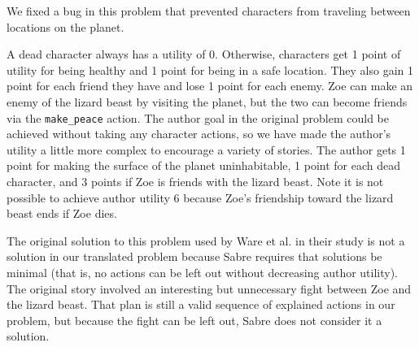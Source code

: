 \documentclass{nilreport}
\begin{document}
We fixed a bug in this problem that prevented characters from traveling
between locations on the planet.

A dead character always has a utility of 0. Otherwise, characters
get 1 point of utility for being healthy and 1 point for being in
a safe location. They also gain 1 point for each friend they have
and lose 1 point for each enemy. Zoe can make an enemy of the lizard
beast by visiting the planet, but the two can become friends via the
\texttt{make\_peace} action. The author goal in the original problem
could be achieved without taking any character actions, so we have
made the author's utility a little more complex to encourage a variety
of stories. The author gets 1 point for making the surface of the
planet uninhabitable, 1 point for each dead character, and 3 points
if Zoe is friends with the lizard beast. Note it is not possible to
achieve author utility 6 because Zoe's friendship toward the lizard
beast ends if Zoe dies.

The original solution to this problem used by Ware et al. in their
study is not a solution in our translated problem because Sabre requires
that solutions be minimal (that is, no actions can be left out without
decreasing author utility). The original story involved an interesting
but unnecessary fight between Zoe and the lizard beast. That plan
is still a valid sequence of explained actions in our problem, but
because the fight can be left out, Sabre does not consider it a solution.

\medskip{}
\noindent{}

\medskip{}
\noindent{}
\end{document}
